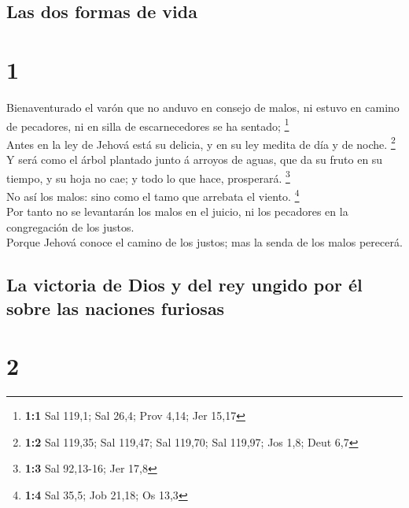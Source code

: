 \hypertarget{las-dos-formas-de-vida}{%
\subsection{Las dos formas de vida}\label{las-dos-formas-de-vida}}

\hypertarget{section}{%
\section{1}\label{section}}

 Bienaventurado el varón que no anduvo en consejo de malos,
ni estuvo en camino de pecadores, ni en silla de escarnecedores se ha
sentado; \footnote{\textbf{1:1} Sal 119,1; Sal 26,4; Prov 4,14; Jer
  15,17}\\
 Antes en la ley de Jehová está su delicia, y en su ley
medita de día y de noche. \footnote{\textbf{1:2} Sal 119,35; Sal 119,47;
  Sal 119,70; Sal 119,97; Jos 1,8; Deut 6,7}\\
 Y será como el árbol plantado junto á arroyos de aguas, que
da su fruto en su tiempo, y su hoja no cae; y todo lo que hace,
prosperará. \footnote{\textbf{1:3} Sal 92,13-16; Jer 17,8}\\
 No así los malos: sino como el tamo que arrebata el viento.
\footnote{\textbf{1:4} Sal 35,5; Job 21,18; Os 13,3}\\
 Por tanto no se levantarán los malos en el juicio, ni los
pecadores en la congregación de los justos.\\
 Porque Jehová conoce el camino de los justos; mas la senda
de los malos perecerá.

\hypertarget{la-victoria-de-dios-y-del-rey-ungido-por-uxe9l-sobre-las-naciones-furiosas}{%
\subsection{La victoria de Dios y del rey ungido por él sobre las
naciones
furiosas}\label{la-victoria-de-dios-y-del-rey-ungido-por-uxe9l-sobre-las-naciones-furiosas}}

\hypertarget{section-1}{%
\section{2}\label{section-1}}

